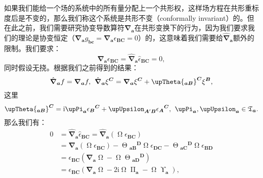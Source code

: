如果我们能给一个场的系统中的所有量分配上一个共形权，这样场方程在共形重标度后是不变的，那么我们称这个系统是共形不变（conformally invariant）的。但在此之前，我们需要研究协变导数算符$\boldsymbol{\nabla }_{\boldsymbol{a}}$在共形变换下的行为，因为我们要求我们的理论是协变恒定（$\boldsymbol{\nabla }_{\boldsymbol{a}} g_{\boldsymbol{bc}} =\boldsymbol{\nabla }_{\boldsymbol{a}} \epsilon _{\boldsymbol{BC}} =0$）的，这意味着我们需要给$\hat{\boldsymbol{\nabla }}_{\boldsymbol{a}}$额外的限制。我们要求：
\begin{equation*}
	\boldsymbol{\nabla }_{\boldsymbol{a}} \epsilon _{\boldsymbol{BC}} =\hat{\boldsymbol{\nabla }}_{\boldsymbol{a}}\hat{\epsilon }_{\boldsymbol{BC}} =0,
\end{equation*}
同时假设无挠。根据我们之前得到的结果：
\begin{equation*}
	\hat{\boldsymbol{\nabla }}_{\boldsymbol{a}} f=\boldsymbol{\nabla }_{\boldsymbol{a}} f,\kern+0.4em \hat{\boldsymbol{\nabla }}_{\boldsymbol{a}} \xi ^{\boldsymbol{C}} =\boldsymbol{\nabla }_{\boldsymbol{a}} \xi ^{\boldsymbol{C}} +\upTheta {_{\boldsymbol{aB}}}^{\boldsymbol{C}} \xi ^{\boldsymbol{B}} ,
\end{equation*}
这里
\begin{equation*}
	\upTheta {_{\boldsymbol{aB}}}^{\boldsymbol{C}} =\mathrm{i} \upPi _{\boldsymbol{a}} \epsilon {_{\boldsymbol{B}}}^{\boldsymbol{C}} +\upUpsilon _{\boldsymbol{A} '\boldsymbol{B}} \epsilon {_{\boldsymbol{A}}}^{\boldsymbol{C}} ,\kern+0.4em \upPi _{\boldsymbol{a}} ,\upUpsilon _{\boldsymbol{a}} \in \mathfrak{T}_{\boldsymbol{a}} .
\end{equation*}
那么我们有：
\begin{equation*}
	\begin{aligned}
		0 & =\hat{\boldsymbol{\nabla }}_{\boldsymbol{a}}\hat{\epsilon }_{\boldsymbol{BC}} =\hat{\boldsymbol{\nabla }}_{\boldsymbol{a}} (\upOmega\epsilon _{\boldsymbol{BC}} )\\
		& =\boldsymbol{\nabla }_{\boldsymbol{a}} (\upOmega\epsilon _{\boldsymbol{BC}} )-\upTheta {_{\boldsymbol{aB}}}^{\boldsymbol{D}} \upOmega\epsilon _{\boldsymbol{DC}} -\upTheta {_{\boldsymbol{aC}}}^{\boldsymbol{D}} \upOmega\epsilon _{\boldsymbol{BD}}\\
		& =\epsilon _{\boldsymbol{BC}} (\boldsymbol{\nabla }_{\boldsymbol{a}} \upOmega-\upOmega\upTheta {_{\boldsymbol{aD}}}^{\boldsymbol{D}} )\\
		& =\epsilon _{\boldsymbol{BC}} (\boldsymbol{\nabla }_{\boldsymbol{a}} \upOmega-2\mathrm{i} \upOmega\upPi _{\boldsymbol{a}} -\upOmega\upUpsilon _{\boldsymbol{a}} ),
	\end{aligned}
\end{equation*}
